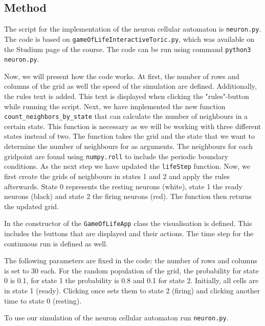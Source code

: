 \subsection{Method}
The script for the implementation of the neuron cellular automaton is \verb+neuron.py+. The code is based on \verb+gameOfLifeInteractiveToric.py+, which was available on the Studium page of the course. The code can be run using command \verb+python3 neuron.py+.

Now, we will present how the code works. At first, the number of rows and columns of the grid as well the speed of the simulation are defined. 
Additionally, the rules text is added. This text is displayed when clicking the "rules"-button while running the script. 
Next, we have implemented the new function \verb+count_neighbors_by_state+ that can calculate the number of neighbours in a certain state. 
This function is necessary as we will be working with three different states instead of two.
The function takes the grid and the state that we want to determine the number of neighbours for as arguments. 
The neighbours for each gridpoint are found using \verb+numpy.roll+ to include the periodic boundary conditions. 
As the next step we have updated the \verb+lifeStep+ function. Now, we first create the grids of neighbours in states 1 and 2 and apply the rules afterwards. 
State 0 represents the resting neurons (white), state 1 the ready neurons (black) and state 2 the firing neurons (red). The function then returns the updated grid. 

In the constructor of the \verb+GameOfLifeApp+ class the visualisation is defined. This includes the buttons that are displayed and their actions. 
The time step for the continuous run is defined as well. 

The following parameters are fixed in the code: the number of rows and columns is set to 30 each. For the random population of the grid, 
the probability for state 0 is 0.1, for state 1 the probability is 0.8 and 0.1 for state 2. Initially, all cells are in state 1 (ready). Clicking once sets them to state 2 (firing) and clicking another time to state 0 (resting). 

To use our simulation of the neuron cellular automaton run \verb+neuron.py+.